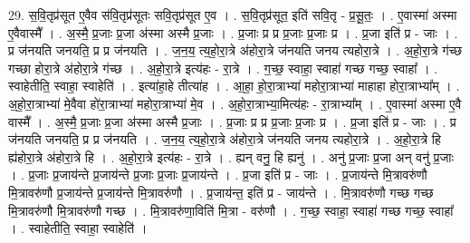 \documentclass[17pt]{extarticle}
\begin{document}
29. स॒वि॒तृप्र॑सूत ए॒वैव स॑वि॒तृप्र॑सूतः सवि॒तृप्र॑सूत ए॒व । . स॒वि॒तृप्र॑सूत॒ इति॑ सवि॒तृ - प्र॒सू॒तः॒ । . ए॒वास्मा॑ अस्मा ए॒वैवास्मै᳚ । . अ॒स्मै॒ प्र॒जाः प्र॒जा अ॑स्मा अस्मै प्र॒जाः । . प्र॒जाः प्र प्र प्र॒जाः प्र॒जाः प्र । . प्र॒जा इति॑ प्र - जाः । . प्र ज॑नयति जनयति॒ प्र प्र ज॑नयति । . ज॒न॒य॒ त्य॒हो॒रा॒त्रे अ॑होरा॒त्रे ज॑नयति जनय त्यहोरा॒त्रे । . अ॒हो॒रा॒त्रे ग॑च्छ गच्छा होरा॒त्रे अ॑होरा॒त्रे ग॑च्छ । . अ॒हो॒रा॒त्रे इत्य॑हः - रा॒त्रे । . ग॒च्छ॒ स्वाहा॒ स्वाहा॑ गच्छ गच्छ॒ स्वाहा᳚ । . स्वाहेतीति॒ स्वाहा॒ स्वाहेति॑ । . इत्या॑हा॒हे तीत्या॑ह । . आ॒हा॒ हो॒रा॒त्राभ्या॑ महोरा॒त्राभ्या॑ माहाहा होरा॒त्राभ्या᳚म् । . अ॒हो॒रा॒त्राभ्या॑ मे॒वैवा हो॑रा॒त्राभ्या॑ महोरा॒त्राभ्या॑ मे॒व । . अ॒हो॒रा॒त्राभ्या॒मित्य॑हः - रा॒त्राभ्या᳚म् । . ए॒वास्मा॑ अस्मा ए॒वै वास्मै᳚ । . अ॒स्मै॒ प्र॒जाः प्र॒जा अ॑स्मा अस्मै प्र॒जाः । . प्र॒जाः प्र प्र प्र॒जाः प्र॒जाः प्र । . प्र॒जा इति॑ प्र - जाः । . प्र ज॑नयति जनयति॒ प्र प्र ज॑नयति । . ज॒न॒य॒ त्य॒हो॒रा॒त्रे अ॑होरा॒त्रे ज॑नयति जनय त्यहोरा॒त्रे । . अ॒हो॒रा॒त्रे हि ह्य॑होरा॒त्रे अ॑होरा॒त्रे हि । . अ॒हो॒रा॒त्रे इत्य॑हः - रा॒त्रे । . ह्यन् वनु॒ हि ह्यनु॑ । . अनु॑ प्र॒जाः प्र॒जा अन् वनु॑ प्र॒जाः । . प्र॒जाः प्र॒जाय॑न्ते प्र॒जाय॑न्ते प्र॒जाः प्र॒जाः प्र॒जाय॑न्ते । . प्र॒जा इति॑ प्र - जाः । . प्र॒जाय॑न्ते मि॒त्रावरु॑णौ मि॒त्रावरु॑णौ प्र॒जाय॑न्ते प्र॒जाय॑न्ते मि॒त्रावरु॑णौ । . प्र॒जाय॑न्त॒ इति॑ प्र - जाय॑न्ते । . मि॒त्रावरु॑णौ गच्छ गच्छ मि॒त्रावरु॑णौ मि॒त्रावरु॑णौ गच्छ । . मि॒त्रावरु॑णा॒विति॑ मि॒त्रा - वरु॑णौ । . ग॒च्छ॒ स्वाहा॒ स्वाहा॑ गच्छ गच्छ॒ स्वाहा᳚ । . स्वाहेतीति॒ स्वाहा॒ स्वाहेति॑ । \newline
\end{document}
